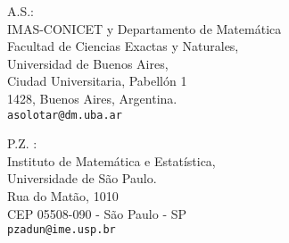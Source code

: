 \documentclass[11pt,fleqn]{article}
\begin{document}
\vspace{5em}

\noindent A.S.: \\
IMAS-CONICET y Departamento de Matem\'atica\\
Facultad de Ciencias Exactas y Naturales,\\
Universidad de Buenos Aires,\\
Ciudad Universitaria, Pabell\'on 1\\
1428, Buenos Aires, Argentina.\\
\texttt{asolotar@dm.uba.ar}

\bigskip

\noindent P.Z. :\\
Instituto de Matem\'atica e Estat\'istica, \\
Universidade de S\~ao Paulo. \\
Rua do Matão, 1010 \\
CEP 05508-090 - S\~ao Paulo - SP\\
\texttt{pzadun@ime.usp.br}
\end{document}
